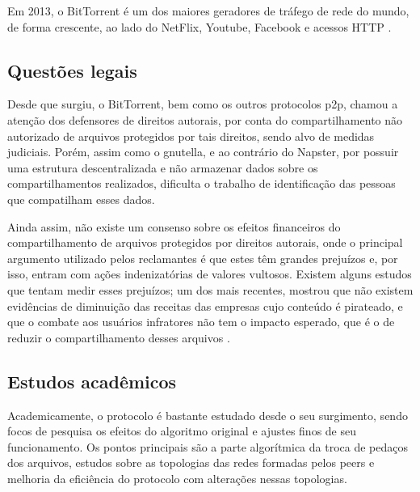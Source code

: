 Em 2013, o BitTorrent é um dos maiores geradores de tráfego de rede do mundo, de forma
crescente, ao lado do NetFlix, Youtube, Facebook e acessos HTTP
\cite{report:internet-usage-2013}.

\subsection{Questões legais}

Desde que surgiu, o BitTorrent, bem como os outros protocolos \gls*{p2p}, chamou a
atenção dos defensores de direitos autorais, por conta do compartilhamento não
autorizado de arquivos protegidos por tais direitos, sendo alvo de medidas judiciais.
Porém, assim como o \gls*{gnutella}, e ao contrário do Napster, por possuir uma
estrutura descentralizada e não armazenar dados sobre os compartilhamentos realizados,
dificulta o trabalho de identificação das pessoas que compatilham esses dados.

Ainda assim, não existe um consenso sobre os efeitos financeiros do compartilhamento de
arquivos protegidos por direitos autorais, onde o principal argumento utilizado pelos
reclamantes é que estes têm grandes prejuízos e, por isso, entram com ações
indenizatórias de valores vultosos. Existem alguns estudos que tentam medir esses
prejuízos; um dos mais recentes, mostrou que não existem evidências de diminuição das
receitas das empresas cujo conteúdo é pirateado, e que o combate aos usuários
infratores não tem o impacto esperado, que é o de reduzir o compartilhamento desses
arquivos \cite{report:lse-piracy}.

\subsection{Estudos acadêmicos}


Academicamente, o protocolo é bastante estudado desde o seu surgimento, sendo focos de
pesquisa os efeitos do algoritmo original e ajustes finos de seu funcionamento. Os
pontos principais são a parte algorítmica da troca de pedaços dos arquivos, estudos
sobre as topologias das redes formadas pelos \glspl*{peer} e melhoria da eficiência
do protocolo com alterações nessas topologias.

\afterpage{\clearpage}